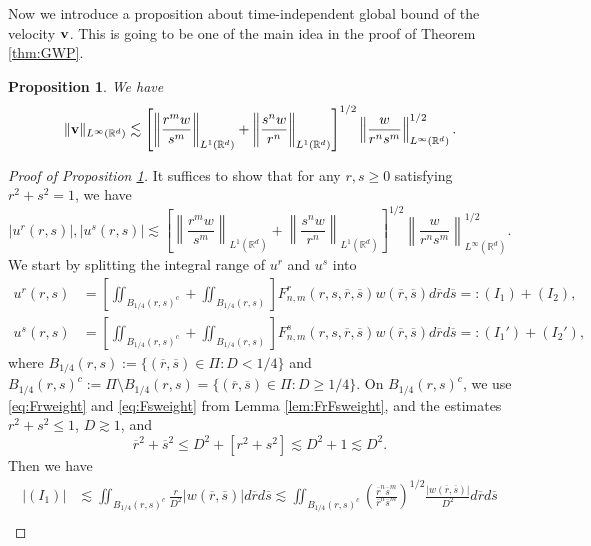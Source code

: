 \documentclass[11pt]{amsart}
\newtheorem{prop}[theorem]{Proposition}
\theoremstyle{definition}
\theoremstyle{remark}
\numberwithin{equation}{section}
\numberwithin{equation}{section}
\newcommand{\nrm}[1]{\Vert#1\Vert}
\newcommand{\br}[1]{\overline{#1}}
\newcommand{\0}{\emptyset}
\newcommand{\ift}{\infty}
\newcommand{\bfv}{{\bf v}}
\newcommand{\bbR}{\mathbb R}
\begin{document}
	Now we introduce a proposition about time-independent global bound of the velocity $\bfv$. This is going to be one of the main idea in the proof of Theorem \ref{thm:GWP}.
	\begin{prop}\label{prop:FStypeu}
		We have
		\begin{equation}\label{eq:FStype}
			\nrm{\bfv}_{L^{\ift}(\bbR^{d})}\lesssim \left[\left\| \frac{r^{m}w}{s^{m}}\right\|_{L^{1}(\bbR^{d})}+\left\| \frac{s^{n}w}{r^{n}}\right\|_{L^{1}(\bbR^{d})}\right]^{1/2}\left\| \frac{w}{r^{n}s^{m}}\right\|_{L^{\ift}(\bbR^{d})}^{1/2}.
		\end{equation}
	\end{prop}
	
	\begin{proof}[Proof of Proposition \ref{prop:FStypeu}]
		It suffices to show that for any $r,s\geq0$ satisfying $r^{2}+s^{2}=1$, we have
		\begin{equation}\label{eq:FStypescale}
			|u^{r}(r,s)|, |u^{s}(r,s)|\lesssim \left[\left\| \frac{r^{m}w}{s^{m}}\right\|_{L^{1}(\bbR^{d})}+\left\| \frac{s^{n}w}{r^{n}}\right\|_{L^{1}(\bbR^{d})}\right]^{1/2}\left\| \frac{w}{r^{n}s^{m}}\right\|_{L^{\ift}(\bbR^{d})}^{1/2}.
		\end{equation}
		We start by splitting the integral range of $u^{r}$ and $u^{s}$ into
		\begin{equation}
			\begin{aligned}
				u^{r}(r,s)&=\left[\iint_{B_{1/4}(r,s)^{c}}+\iint_{B_{1/4}(r,s)}\right]F_{n,m}^{r}(r,s,\br{r},\br{s})w(\br{r},\br{s})d\br{r}d\br{s}=:(I_{1})+(I_{2}),\\
				u^{s}(r,s)&=\left[\iint_{B_{1/4}(r,s)^{c}}+\iint_{B_{1/4}(r,s)}\right]F_{n,m}^{s}(r,s,\br{r},\br{s})w(\br{r},\br{s})d\br{r}d\br{s}=:(I_{1}')+(I_{2}'),
			\end{aligned}
		\end{equation}
		where $B_{1/4}(r,s):=\{ (\br{r},\br{s})\in \Pi : D<1/4\}$ and $ B_{1/4}(r,s)^{c}:=\Pi\setminus B_{1/4}(r,s)=\{ (\br{r},\br{s})\in \Pi : D\geq 1/4\} $. 
		On $ B_{1/4}(r,s)^{c} $, we use \eqref{eq:Frweight} and \eqref{eq:Fsweight} from Lemma \ref{lem:FrFsweight}, and the estimates $r^{2}+s^{2}\leq1$, $D\gtrsim 1$, and
		$$ \br{r}^{2}+\br{s}^{2}\leq D^{2}+[r^{2}+s^{2}] \lesssim D^{2}+1\lesssim D^{2}. $$
		Then we have
		\begin{equation}
			\begin{aligned}
				|(I_{1})|&\lesssim \iint_{B_{1/4}(r,s)^{c}}\frac{r}{D^{2}}%
				|w(\br{r},\br{s})|d\br{r}d\br{s}\lesssim \iint_{B_{1/4}(r,s)^{c}}\left(\frac{\br{r}^{n}\br{s}^{m}}{\br{r}^{n}\br{s}^{m}}\right)^{1/2}\frac{|w(\br{r},\br{s})|}{D^{2}}d\br{r}d\br{s}\\

\end{aligned}
\end{equation}
\end{proof}
\end{document}
